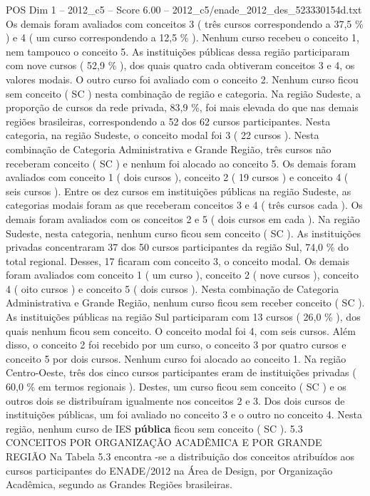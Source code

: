 \begin{textsample}{POS Dim 1 – 2012\_c5 – Score 6.00 – 2012\_c5/enade\_2012\_des\_523330154d.txt}
Os demais foram avaliados com conceitos 3 ( três cursos correspondendo a 37,5 \% ) e 4 ( um curso correspondendo a 12,5 \% ).
Nenhum curso recebeu o conceito 1, nem tampouco o conceito 5.
As instituições públicas dessa região participaram com nove cursos ( 52,9 \% ), dos quais quatro cada obtiveram conceitos 3 e 4, os valores modais.
O outro curso foi avaliado com o conceito 2.
Nenhum curso ficou sem conceito ( SC ) nesta combinação de região e categoria.
Na região Sudeste, a proporção de cursos da rede privada, 83,9 \%, foi mais elevada do que nas demais regiões brasileiras, correspondendo a 52 dos 62 cursos participantes.
Nesta categoria, na região Sudeste, o conceito modal foi 3 ( 22 cursos ).
Nesta combinação de Categoria Administrativa e Grande Região, três cursos não receberam conceito ( SC ) e nenhum foi alocado ao conceito 5.
Os demais foram avaliados com conceito 1 ( dois cursos ), conceito 2 ( 19 cursos ) e conceito 4 ( seis cursos ).
Entre os dez cursos em instituições públicas na região Sudeste, as categorias modais foram as que receberam conceitos 3 e 4 ( três cursos cada ).
Os demais foram avaliados com os conceitos 2 e 5 ( dois cursos em cada ).
Na região Sudeste, nesta categoria, nenhum curso ficou sem conceito ( SC ).
As instituições privadas concentraram 37 dos 50 cursos participantes da região Sul, 74,0 \% do total regional.
Desses, 17 ficaram com conceito 3, o conceito modal.
Os demais foram avaliados com conceito 1 ( um curso ), conceito 2 ( nove cursos ), conceito 4 ( oito cursos ) e conceito 5 ( dois cursos ).
Nesta combinação de Categoria Administrativa e Grande Região, nenhum curso ficou sem receber conceito ( SC ).
As instituições públicas na região Sul participaram com 13 cursos ( 26,0 \% ), dos quais nenhum ficou sem conceito.
O conceito modal foi 4, com seis cursos.
Além disso, o conceito 2 foi recebido por um curso, o conceito 3 por quatro cursos e conceito 5 por dois cursos.
Nenhum curso foi alocado ao conceito 1.
Na região Centro-Oeste, três dos cinco cursos participantes eram de instituições privadas ( 60,0 \% em termos regionais ).
Destes, um curso ficou sem conceito ( SC ) e os outros dois se distribuíram igualmente nos conceitos 2 e 3.
Dos dois cursos de instituições públicas, um foi avaliado no conceito 3 e o outro no conceito 4.
Nesta região, nenhum curso de IES \textbf{pública} ficou sem conceito ( SC ). 5.3 CONCEITOS POR ORGANIZAÇÃO ACADÊMICA E POR GRANDE REGIÃO Na Tabela 5.3 encontra -se a distribuição dos conceitos atribuídos aos cursos participantes do ENADE/2012 na Área de Design, por Organização Acadêmica, segundo as Grandes Regiões brasileiras.

\end{textsample}
